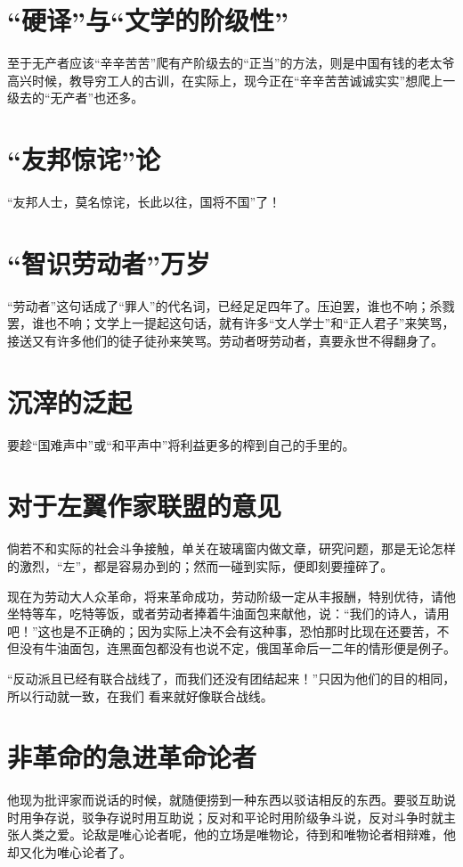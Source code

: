 \documentclass[a4paper]{article}
\begin{document}
\begin{sloppy}
        \section{
            “硬译”与“文学的阶级性”
        }
        至于无产者应该“辛辛苦苦”爬有产阶级去的“正当”的方法，则是中国有钱的老太爷高兴时候，教导穷工人的古训，在实际上，现今正在“辛辛苦苦诚诚实实”想爬上一级去的“无产者”也还多。

        \section{
            “友邦惊诧”论
        }
        “友邦人士，莫名惊诧，长此以往，国将不国”了！

        \section{
            “智识劳动者”万岁
        }
        “劳动者”这句话成了“罪人”的代名词，已经足足四年了。压迫罢，谁也不响；杀戮罢，谁也不响；文学上一提起这句话，就有许多“文人学士”和“正人君子”来笑骂，接送又有许多他们的徒子徒孙来笑骂。劳动者呀劳动者，真要永世不得翻身了。

        \section{
            沉滓的泛起
        }
        要趁“国难声中”或“和平声中”将利益更多的榨到自己的手里的。

        \section{
            对于左翼作家联盟的意见
        }
        倘若不和实际的社会斗争接触，单关在玻璃窗内做文章，研究问题，那是无论怎样的激烈，“左”，都是容易办到的；然而一碰到实际，便即刻要撞碎了。

        现在为劳动大人众革命，将来革命成功，劳动阶级一定从丰报酬，特别优待，请他坐特等车，吃特等饭，或者劳动者捧着牛油面包来献他，说：“我们的诗人，请用吧！”这也是不正确的；因为实际上决不会有这种事，恐怕那时比现在还要苦，不但没有牛油面包，连黑面包都没有也说不定，俄国革命后一二年的情形便是例子。

        “反动派且已经有联合战线了，而我们还没有团结起来！”只因为他们的目的相同，所以行动就一致，在我们 看来就好像联合战线。

        \section{
            非革命的急进革命论者
        }
        他现为批评家而说话的时候，就随便捞到一种东西以驳诘相反的东西。要驳互助说时用争存说，驳争存说时用互助说；反对和平论时用阶级争斗说，反对斗争时就主张人类之爱。论敌是唯心论者呢，他的立场是唯物论，待到和唯物论者相辩难，他却又化为唯心论者了。


\end{sloppy}
\end{document}
